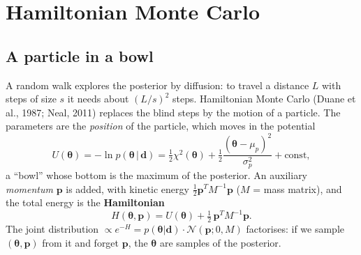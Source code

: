 \documentclass[11pt,a4paper]{article}
\newcommand{\vth}{\boldsymbol{\theta}}
\newcommand{\vp}{\mathbf{p}}
\newcommand{\vd}{\mathbf{d}}
\begin{document}
\section{Hamiltonian Monte Carlo}\label{sec:hmc}

\subsection{A particle in a bowl}
A random walk explores the posterior by diffusion: to travel a distance $L$ with steps of size $s$ it needs
about $(L/s)^2$ steps. Hamiltonian Monte Carlo (Duane et al., 1987; Neal, 2011) replaces the blind steps by the
motion of a particle. The parameters are the \emph{position} of the particle, which moves in the potential
\begin{equation}
  U(\vth) = -\ln p(\vth\,|\,\vd) = \tfrac12\chi^2(\vth) + \tfrac12\frac{(\vth-\mu_p)^2}{\sigma_p^2} + \text{const},
\end{equation}
a ``bowl'' whose bottom is the maximum of the posterior. An auxiliary \emph{momentum} $\vp$ is added, with
kinetic energy $\tfrac12\vp^T M^{-1}\vp$ ($M$ = mass matrix), and the total energy is the \textbf{Hamiltonian}
\begin{equation}
  H(\vth,\vp) = U(\vth) + \tfrac12\,\vp^T M^{-1}\vp .
\end{equation}
The joint distribution $\propto e^{-H} = p(\vth|\vd)\cdot\mathcal{N}(\vp;0,M)$ factorises: if we sample
$(\vth,\vp)$ from it and forget $\vp$, the $\vth$ are samples of the posterior.
\end{document}
